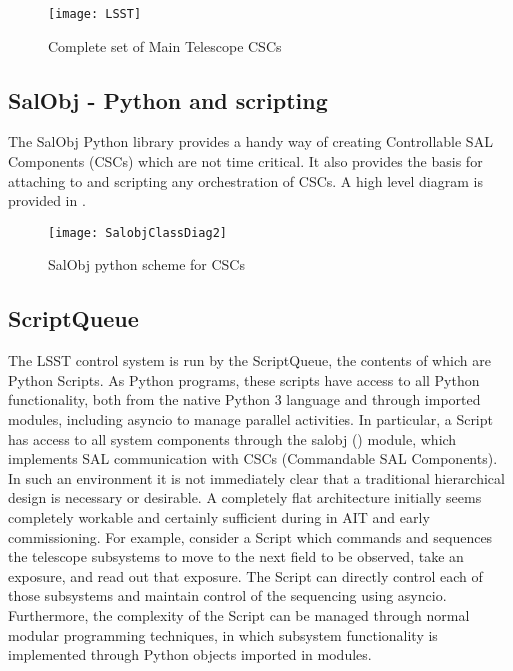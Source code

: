 \begin{figure}
\begin{center}
\texttt{[image: LSST]}
\caption{Complete set of Main Telescope CSCs\label{fig:mtcscs}}
\end{center}
\end{figure}

\subsection{SalObj - Python and scripting }\label{sect:salobj}
The SalObj Python library provides a handy way of creating Controllable SAL Components (CSCs) which are not time critical. It also provides the basis for attaching to and scripting any orchestration of CSCs. A high level diagram is provided in .

\begin{figure}
\begin{center}
\texttt{[image: SalobjClassDiag2]}
\caption{SalObj python scheme for  CSCs\label{fig:salobj}}
\end{center}
\end{figure}

\subsection{ScriptQueue} \label{sect:scriptq}
The LSST control system is run by the ScriptQueue, the contents of which are Python Scripts.
As Python programs, these scripts have access to all Python functionality, both from the native
Python 3 language and through imported modules, including asyncio to manage parallel
activities. In particular, a Script has access to all system components through the salobj ()
module, which implements SAL communication with CSCs (Commandable SAL Components).
In such an environment it is not immediately clear that a traditional hierarchical design is
necessary or desirable. A completely flat architecture initially seems completely workable and certainly sufficient during in AIT and early commissioning.
For example, consider a Script which commands and sequences the telescope subsystems to move
to the next field to be observed, take an exposure, and read out that exposure. The Script can
directly control each of those subsystems and maintain control of the sequencing using asyncio.
Furthermore, the complexity of the Script can be managed through normal modular
programming techniques, in which subsystem functionality is implemented through Python
objects imported in modules.


